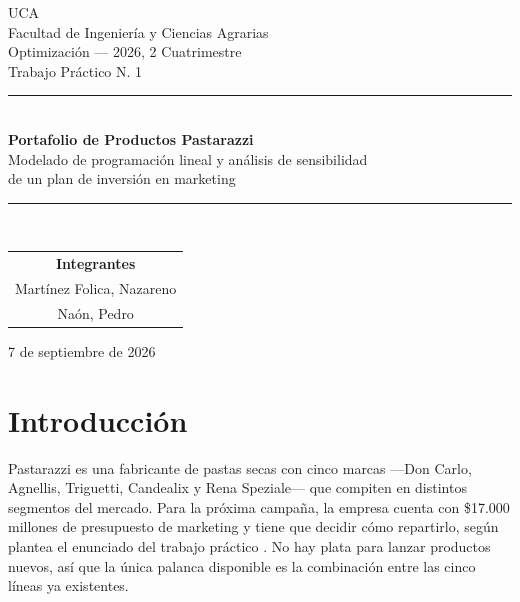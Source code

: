 \documentclass[10pt,a4paper]{article}
\begin{document}
\begin{titlepage}
\begin{center}
\vspace*{1.2cm}
{\large UCA}\\[2pt]
{\large Facultad de Ingeniería y Ciencias Agrarias}\\[1.4cm]

{\large Optimización — 2026, 2\textdegree{} Cuatrimestre}\\[0.3cm]
{\large Trabajo Práctico N.\textdegree{} 1}\\[1.8cm]

\rule{0.85\linewidth}{0.6pt}\\[0.5cm]
{\Huge\bfseries\color{accent} Portafolio de Productos Pastarazzi}\\[0.5cm]
{\Large Modelado de programación lineal y análisis de sensibilidad\\ de un plan de inversión en marketing}\\[0.5cm]
\rule{0.85\linewidth}{0.6pt}\\[2.2cm]

\begin{tabular}{c}
{\large\bfseries Integrantes} \\[0.4cm]
{\large Martínez Folica, Nazareno} \\[0.15cm]
{\large Naón, Pedro}
\end{tabular}

\vfill

{\large 7 de septiembre de 2026}
\end{center}
\end{titlepage}

\tableofcontents
\newpage
{}

\section*{Introducción}

Pastarazzi es una fabricante de pastas secas con cinco marcas —Don Carlo, Agnellis,
Triguetti, Candealix y Rena Speziale— que compiten en distintos segmentos del
mercado. Para la próxima campaña, la empresa cuenta con \$17.000 millones de
presupuesto de marketing y tiene que decidir cómo repartirlo, según plantea el
enunciado del trabajo práctico \cite{consigna}. No hay plata para lanzar
productos nuevos, así que la única palanca disponible es la combinación entre
las cinco líneas ya existentes.
\end{document}
